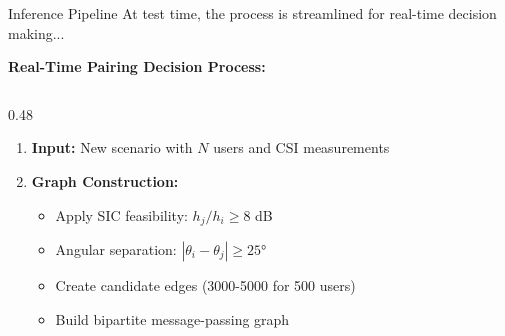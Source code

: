 \documentclass[aspectratio=169]{beamer}
\begin{document}
\begin{frame}{Inference Pipeline}
    \vspace{-0.3cm}
    \small \textcolor{iiitblue}{At test time, the process is streamlined for real-time decision making...}
    
    \vspace{0.05cm}
    
    \textbf{Real-Time Pairing Decision Process:}
    
    
    
    \begin{columns}[T]
        \begin{column}{0.48\textwidth} \vspace{-.2cm}
            \begin{enumerate}\itemsep0.1em
                \item \textbf{Input:} New scenario with $N$ users and CSI measurements
                
                \item \textbf{Graph Construction:}
                \begin{itemize}\itemsep0em
                    \item Apply SIC feasibility: $h_j/h_i \geq 8$ dB
                    \item Angular separation: $|\theta_i - \theta_j| \geq 25°$
                    \item Create candidate edges (3000-5000 for 500 users)
                    \item Build bipartite message-passing graph
                \end{itemize}
                

\end{enumerate}
\end{column}
\end{columns}
\end{frame}
\end{document}

